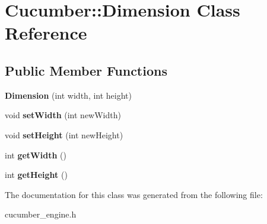 \hypertarget{classCucumber_1_1Dimension}{}\section{Cucumber\+:\+:Dimension Class Reference}
\label{classCucumber_1_1Dimension}
\subsection*{Public Member Functions}
\begin{DoxyCompactItemize}
\item 
\hypertarget{classCucumber_1_1Dimension_afd4471ed4bd900d407098beee8e972d7}{}\label{classCucumber_1_1Dimension_afd4471ed4bd900d407098beee8e972d7} 
{\bfseries Dimension} (int width, int height)
\item 
\hypertarget{classCucumber_1_1Dimension_a9bb802ccf9680f0e5dba3948fca58103}{}\label{classCucumber_1_1Dimension_a9bb802ccf9680f0e5dba3948fca58103} 
void {\bfseries set\+Width} (int new\+Width)
\item 
\hypertarget{classCucumber_1_1Dimension_a7c87916e0c7fedfd2d724ef0082aff11}{}\label{classCucumber_1_1Dimension_a7c87916e0c7fedfd2d724ef0082aff11} 
void {\bfseries set\+Height} (int new\+Height)
\item 
\hypertarget{classCucumber_1_1Dimension_a4fb13eae0bf30fff5265df7ebaba2efb}{}\label{classCucumber_1_1Dimension_a4fb13eae0bf30fff5265df7ebaba2efb} 
int {\bfseries get\+Width} ()
\item 
\hypertarget{classCucumber_1_1Dimension_ac59f2f504d22a5d42d8601462fd87297}{}\label{classCucumber_1_1Dimension_ac59f2f504d22a5d42d8601462fd87297} 
int {\bfseries get\+Height} ()
\end{DoxyCompactItemize}


The documentation for this class was generated from the following file\+:\begin{DoxyCompactItemize}
\item 
cucumber\+\_\+engine.\+h\end{DoxyCompactItemize}
